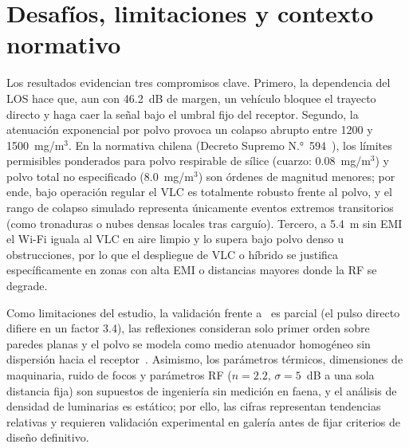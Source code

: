 \documentclass[conference]{IEEEtran}
\begin{document}
\section{Desafíos, limitaciones y contexto normativo}
Los resultados evidencian tres compromisos clave. Primero, la dependencia del LOS hace que, aun con 46.2~dB de margen, un vehículo bloquee el trayecto directo y haga caer la señal bajo el umbral fijo del receptor. Segundo, la atenuación exponencial por polvo provoca un colapso abrupto entre 1200 y 1500~mg/m$^{3}$. En la normativa chilena (Decreto Supremo N.°~594~\cite{ds594}), los límites permisibles ponderados para polvo respirable de sílice (cuarzo: 0.08~mg/m$^{3}$) y polvo total no especificado (8.0~mg/m$^{3}$) son órdenes de magnitud menores; por ende, bajo operación regular el VLC es totalmente robusto frente al polvo, y el rango de colapso simulado representa únicamente eventos extremos transitorios (como tronaduras o nubes densas locales tras carguío). Tercero, a 5.4~m sin EMI el Wi-Fi iguala al VLC en aire limpio y lo supera bajo polvo denso u obstrucciones, por lo que el despliegue de VLC o híbrido se justifica específicamente en zonas con alta EMI o distancias mayores donde la RF se degrade.

Como limitaciones del estudio, la validación frente a~\cite{palacios2020} es parcial (el pulso directo difiere en un factor 3.4), las reflexiones consideran solo primer orden sobre paredes planas y el polvo se modela como medio atenuador homogéneo sin dispersión hacia el receptor~\cite{palacios2022}. Asimismo, los parámetros térmicos, dimensiones de maquinaria, ruido de focos y parámetros RF ($n=2.2$, $\sigma=5$~dB a una sola distancia fija) son supuestos de ingeniería sin medición en faena, y el análisis de densidad de luminarias es estático; por ello, las cifras representan tendencias relativas y requieren validación experimental en galería antes de fijar criterios de diseño definitivo.
\end{document}
